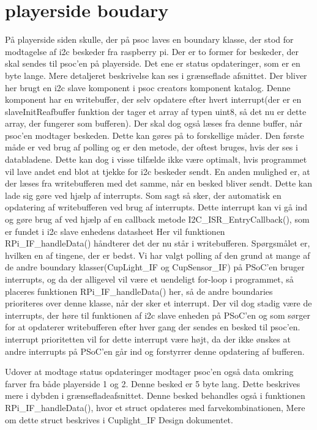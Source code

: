 \documentclass[Softwaredesign/Softwaredesign_main.tex]{subfiles}
\begin{document}
\section{playerside boudary}
På playerside siden skulle, der på psoc laves en boundary klasse, der stod for modtagelse af i2c beskeder fra raspberry pi. Der er to former for beskeder, der skal sendes til psoc'en på playerside. Det ene er status opdateringer, som er en byte lange. Mere detaljeret beskrivelse kan ses i grænseflade afsnittet. Der bliver her brugt en i2c slave komponent i psoc creators komponent katalog. Denne komponent har en writebuffer, der selv opdatere efter hvert interrupt(der er en slaveInitReafbuffer funktion der tager et array af typen uint8, så det nu er dette array, der fungerer som bufferen). Der skal dog også læses fra denne buffer, når psoc'en modtager beskeden. Dette kan gøres på to forskellige måder. Den første måde er ved brug af polling og er den metode, der oftest bruges, hvis der ses i databladene. Dette kan dog i visse tilfælde ikke være optimalt, hvis programmet vil lave andet end blot at tjekke for i2c beskeder sendt. En anden mulighed er, at der læses fra writebufferen med det samme, når en besked bliver sendt. Dette kan lade sig gøre ved hjælp af interrupts. Som sagt så sker, der automatisk en opdatering af writebufferen ved brug af interrupts. Dette interrupt kan vi gå ind og gøre brug af ved hjælp af en callback metode I2C\_ISR\_EntryCallback(), som er fundet i i2c slave enhedens datasheet Her vil funktionen RPi\_IF\_handleData() håndterer det der nu står i writebufferen. Spørgsmålet er, hvilken en af tingene, der er bedst. Vi har valgt polling af den grund at mange af de andre boundary klasser(CupLight\_IF og CupSensor\_IF) på PSoC'en bruger interrupts, og da der alligevel vil være et uendeligt for-loop i programmet, så placeres funktionen RPi\_IF\_handleData() her, så de andre boundaries prioriteres over denne klasse, når der sker et interrupt. Der vil dog stadig være de interrupts, der høre til funktionen af i2c slave enheden på PSoC'en og som sørger for at opdaterer writebufferen efter hver gang der sendes en besked til psoc'en. interrupt prioritetten vil for dette interrupt være højt, da der ikke ønskes at andre interrupts på PSoC'en går ind og forstyrrer denne opdatering af bufferen.  

Udover at modtage status opdateringer modtager psoc'en også data omkring farver fra både playerside 1 og 2. Denne besked er 5 byte lang. Dette beskrives mere i dybden i grænsefladeafsnittet. Denne besked behandles også i funktionen  RPi\_IF\_handleData(), hvor et struct opdateres med farvekombinationen, Mere om dette struct beskrives i Cuplight_IF Design dokumentet. 
\end{document}
